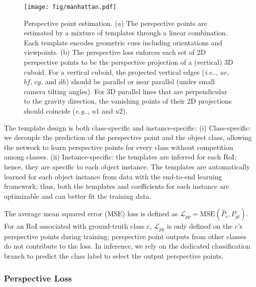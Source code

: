 \documentclass{article}
\makeatletter
\DeclareRobustCommand\onedot{\futurelet\@let@token\@onedot}
\def\@onedot{\ifx\@let@token.\else.\null\fi\xspace}
\def\eg{\emph{e.g}\onedot} \def\Eg{\emph{E.g}\onedot}
\def\ie{\emph{i.e}\onedot} \def\Ie{\emph{I.e}\onedot}
\makeatother
\begin{document}

\begin{figure}[t!]
    \begin{center}
        \texttt{[image: fig/manhattan.pdf]}
    \end{center}
    \caption{Perspective point estimation. (a) The perspective points are estimated by a mixture of templates through a linear combination. Each template encodes geometric cues including orientations and viewpoints. (b) The perspective loss enforces each set of 2D perspective points to be the perspective projection of a (vertical) 3D cuboid. For a vertical cuboid, the projected vertical edges (\ie, $ae$, $bf$, $cg$, and $dh$) should be parallel or near parallel (under small camera tilting angles). For 3D parallel lines that are perpendicular to the gravity direction, the vanishing points of their 2D projections should coincide (\eg, $u1$ and $u2$).}
    \label{fig:perspective}
\end{figure}

The template design is both class-specific and instance-specific: (i) Class-specific: we decouple the prediction of the perspective point and the object class, allowing the network to learn perspective points for every class without competition among classes. (ii) Instance-specific: the templates are inferred for each RoI; hence, they are specific to each object instance. The templates are automatically learned for each object instance from data with the end-to-end learning framework; thus, both the templates and coefficients for each instance are optimizable and can better fit the training data.

The average mean squared error (MSE) loss is defined as $\mathcal{L}_{pp} = \text{MSE} (\hat{P}_c, P_{gt})$. For an RoI associated with ground-truth class $c$, $\mathcal{L}_{pp}$ is only defined on the $c$'s perspective points during training; perspective point outputs from other classes do not contribute to the loss. In inference, we rely on the dedicated classification branch to predict the class label to select the output perspective points.

\subsubsection{Perspective Loss}
\end{document}
